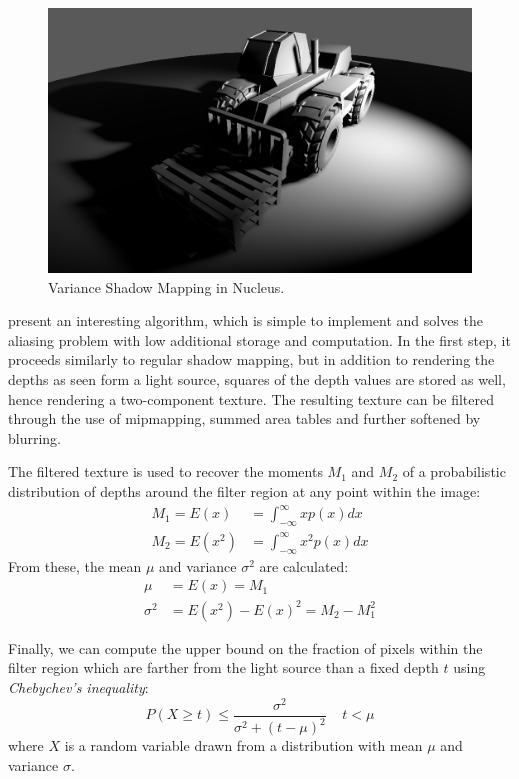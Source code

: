 \begin{figure}[ht!]
  \centering
    \includegraphics[width=0.9\linewidth]{./Figures/shadowMapping/manitouVSM.png}
    \caption[VSM in Nucleus]{Variance Shadow Mapping in Nucleus.}
  \label{fig:NucleusVSM}
\end{figure}

\citet{Donnelly06varianceshadow} present an interesting algorithm, which is simple to implement and solves the aliasing problem with low additional storage and computation. In the first step, it proceeds similarly to regular shadow mapping, but in addition to rendering the depths as seen form a light source, squares of the depth values are stored as well, hence rendering a two-component texture. The resulting texture can be filtered through the use of mipmapping, summed area tables and further softened by blurring.

The filtered texture is used to recover the moments $M_1$ and $M_2$ of a probabilistic distribution of depths around the filter region at any point within the image:
\begin{align*}
M_1 = E(x) &= \int_{-\infty}^\infty xp(x)dx \\
M_2 = E(x^2) &= \int_{-\infty}^\infty x^2p(x)dx
\end{align*}
From these, the mean $\mu$ and variance $\sigma^2$ are calculated:
\begin{align*}
\mu &= E(x) = M_1\\
\sigma^2 &= E(x^2) - E(x)^2 = M_2 - M_1^2
\end{align*}

Finally, we can compute the upper bound on the fraction of pixels within the filter region which are farther from the light source than a fixed depth $t$ using \emph{Chebychev's inequality}:
\[
P(X \geq t) \leq \frac{\sigma^2}{\sigma^2 + (t - \mu)^2} \;\;\;\; t < \mu
\]
where $X$ is a random variable drawn from a distribution with mean $\mu$ and variance $\sigma$.

